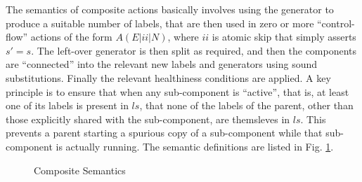 The semantics of composite actions basically involves using the generator
to produce a suitable number of labels,
that are then used in zero or more ``control-flow'' actions
of the form $A(E|ii|N)$, where $ii$ is atomic skip that simply asserts $s'=s$.
The left-over generator is then split as required,
and then the components are ``connected'' into
the relevant new labels and generators using sound substitutions.
Finally the relevant healthiness conditions are applied.
A key principle is to ensure that when any sub-component is ``active'',
that is, at least one of its labels is present in $ls$,
that none of the labels of the parent,
other than those explicitly shared with the sub-component,
are themsleves in $ls$.
This prevents a parent starting a spurious copy of a sub-component
while that sub-component is actually running.
The semantic definitions are listed in Fig. \ref{fig:composite-semantics}.
\begin{figure}[t]
  \caption{Composite Semantics}
  \label{fig:composite-semantics}
\end{figure}

